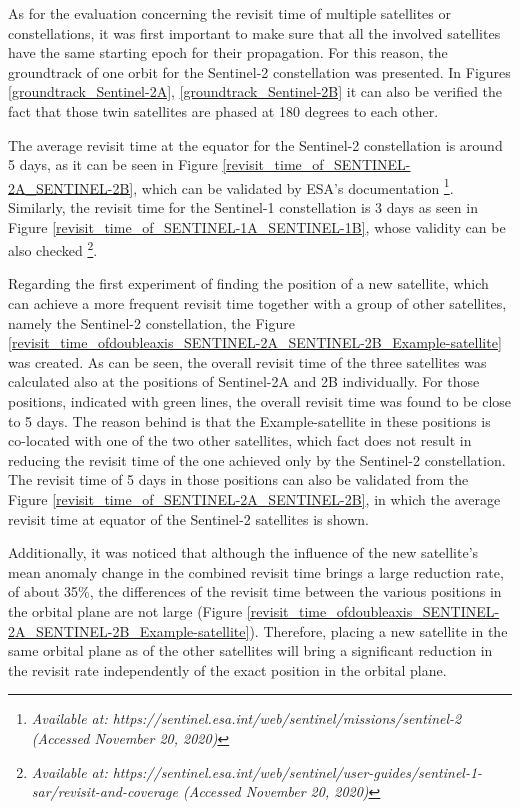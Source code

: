 \bigskip
As for the evaluation concerning the revisit time of multiple satellites or constellations, it was first important to make sure that all the involved satellites have the same starting epoch for their propagation. For this reason, the groundtrack of one orbit for the Sentinel-2 constellation was presented. In Figures \ref{groundtrack_Sentinel-2A}, 
\ref{groundtrack_Sentinel-2B} it can also be verified the fact that those twin satellites are phased at 180 degrees to each other.

The average revisit time at the equator for the Sentinel-2 constellation is around 5 days, as it can be seen in Figure \ref{revisit_time_of_SENTINEL-2A_SENTINEL-2B}, which can be validated by ESA's documentation \footnote{\label{Sentinel2_source}\textit{Available at: https://sentinel.esa.int/web/sentinel/missions/sentinel-2 (Accessed November 20, 2020)}}. Similarly, the revisit time for the Sentinel-1 constellation is 3 days as seen in Figure \ref{revisit_time_of_SENTINEL-1A_SENTINEL-1B}, whose validity can be also checked \footnote{\label{Sentinel1_source}\textit{Available at: https://sentinel.esa.int/web/sentinel/user-guides/sentinel-1-sar/revisit-and-coverage (Accessed November 20, 2020)}}.

\bigskip
Regarding the first experiment of finding the position of a new satellite, which can achieve a more frequent revisit time together with a group of other satellites, namely the Sentinel-2 constellation, the Figure \ref{revisit_time_ofdoubleaxis_SENTINEL-2A_SENTINEL-2B_Example-satellite} was created. As can be seen, the overall revisit time of the three satellites was calculated also at the positions of Sentinel-2A and 2B individually. For those positions, indicated with green lines, the overall revisit time was found to be close to 5 days. The reason behind is that the Example-satellite in these positions is co-located with one of the two other satellites, which fact does not result in reducing the revisit time of the one achieved only by the Sentinel-2 constellation. The revisit time of 5 days in those positions can also be validated from the Figure \ref{revisit_time_of_SENTINEL-2A_SENTINEL-2B}, in which the average revisit time at equator of the Sentinel-2 satellites is shown.

Additionally, it was noticed that although the influence of the new satellite's mean anomaly change in the combined revisit time brings a large reduction rate, of about 35\%, the differences of the revisit time between the various positions in the orbital plane are not large (Figure \ref{revisit_time_ofdoubleaxis_SENTINEL-2A_SENTINEL-2B_Example-satellite}). Therefore, placing a new satellite in the same orbital plane as of the other satellites will bring a significant reduction in the revisit rate independently of the exact position in the orbital plane. %

